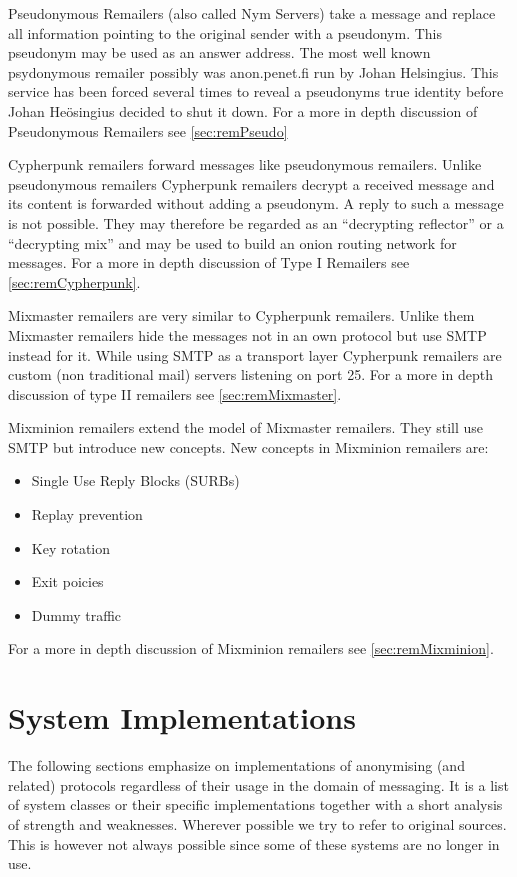 
Pseudonymous Remailers (also called Nym Servers) take a message and replace all information pointing to the original sender with a pseudonym. This pseudonym may be used as an answer address. The most well known psydonymous remailer possibly was anon.penet.fi run by Johan Helsingius. This service has been forced several times to reveal a pseudonyms true identity before Johan Heösingius decided to shut it down. For a more in depth discussion of Pseudonymous Remailers see \ref{sec:remPseudo}

Cypherpunk remailers forward messages like pseudonymous remailers. Unlike pseudonymous remailers Cypherpunk remailers decrypt a received message and its content is forwarded without adding a pseudonym. A reply to such a message is not possible. They may therefore be regarded as an ``decrypting reflector'' or a ``decrypting mix'' and may be used to build an onion routing network for messages. For a more in depth discussion of Type I Remailers see \ref{sec:remCypherpunk}.

Mixmaster remailers are very similar to Cypherpunk remailers. Unlike them Mixmaster remailers hide the messages not in an own protocol but use SMTP instead for it. While using SMTP as a transport layer Cypherpunk remailers are custom (non traditional mail) servers listening on port 25. For a more in depth discussion of type II remailers see \ref{sec:remMixmaster}.

Mixminion remailers extend the model of Mixmaster remailers. They still use SMTP but introduce new concepts. New concepts in Mixminion remailers are:
\begin{itemize}
	\item Single Use Reply Blocks (SURBs)
	\item Replay prevention
	\item Key rotation
	\item Exit poicies
	\item Dummy traffic
\end{itemize}
For a more in depth discussion of Mixminion remailers see \ref{sec:remMixminion}.


\section{System Implementations\label{sec:sysImpl}}
The following sections emphasize on implementations of anonymising (and related) protocols regardless of their usage in the domain of messaging. It is a list of system classes or their specific implementations together with a short analysis of strength and weaknesses. Wherever possible we try to refer to original sources. This is however not always possible since some of these systems are no longer in use.

